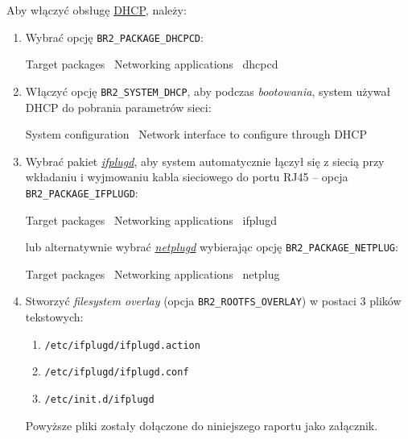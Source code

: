 \documentclass{article}
\newenvironment{ttblock}{\ttfamily}{\par}
\begin{document}
Aby włączyć obsługę \href{https://www.ietf.org/rfc/rfc2131.txt}{DHCP}, należy:
\begin{enumerate}
\item Wybrać opcję \texttt{BR2\_PACKAGE\_DHCPCD}:

\begin{ttblock}
Target packages \textrightarrow\ Networking applications \textrightarrow\ dhcpcd
\end{ttblock}

\item Włączyć opcję \texttt{BR2\_SYSTEM\_DHCP}, aby podczas \emph{bootowania}, system używał DHCP do pobrania parametrów sieci:

\begin{ttblock}
System configuration \textrightarrow\ Network interface to configure through DHCP
\end{ttblock}

\item Wybrać pakiet \emph{\href{http://linux.die.net/man/8/ifplugd}{ifplugd}}, aby system automatycznie łączył się z siecią przy wkładaniu i wyjmowaniu kabla sieciowego do portu RJ45 -- opcja \texttt{BR2\_PACKAGE\_IFPLUGD}:

\begin{ttblock}
Target packages \textrightarrow\ Networking applications \textrightarrow\ ifplugd
\end{ttblock}

lub alternatywnie wybrać \emph{\href{http://linux.die.net/man/8/netplugd}{netplugd}} wybierając opcję \texttt{BR2\_PACKAGE\_NETPLUG}:

\begin{ttblock}
Target packages \textrightarrow\ Networking applications \textrightarrow\ netplug
\end{ttblock}

\item Stworzyć \emph{filesystem overlay} (opcja \texttt{BR2\_ROOTFS\_OVERLAY}) w postaci 3 plików tekstowych:
\begin{enumerate}
	\item \texttt{/etc/ifplugd/ifplugd.action}
	\item \texttt{/etc/ifplugd/ifplugd.conf}
	\item \texttt{/etc/init.d/ifplugd}
\end{enumerate}
Powyższe pliki zostały dołączone do niniejszego raportu jako załącznik.
\end{enumerate}
\end{document}
